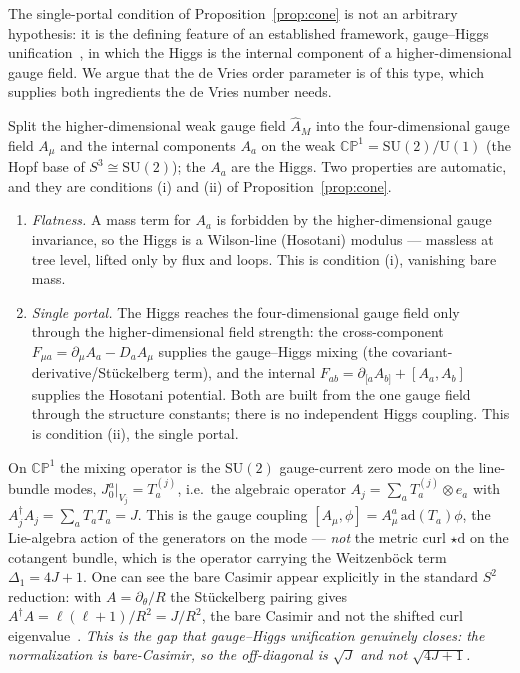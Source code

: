 \documentclass[11pt]{article}
\theoremstyle{plain}
\theoremstyle{definition}
\newcommand{\dd}{\mathrm{d}}
\newcommand{\SU}{\mathrm{SU}}
\newcommand{\U}{\mathrm{U}}
\begin{document}
The single-portal condition of Proposition~\ref{prop:cone} is not an
arbitrary hypothesis: it is the defining feature of an established framework,
gauge--Higgs unification~\cite{Manton1979,Fairlie1979,Hosotani1983}, in which
the Higgs is the internal component of a higher-dimensional gauge field. We
argue that the de Vries order parameter is of this type, which supplies both
ingredients the de Vries number needs.

Split the higher-dimensional weak gauge field $\hat A_M$ into the
four-dimensional gauge field $A_\mu$ and the internal components $A_a$ on the
weak $\mathbb{CP}^1=\SU(2)/\U(1)$ (the Hopf base of $S^3\cong\SU(2)$); the
$A_a$ are the Higgs. Two properties are automatic, and they are conditions
(i) and (ii) of Proposition~\ref{prop:cone}.
\begin{enumerate}
\item \emph{Flatness.} A mass term for $A_a$ is forbidden by the
higher-dimensional gauge invariance, so the Higgs is a Wilson-line (Hosotani)
modulus --- massless at tree level, lifted only by flux and loops. This is
condition (i), vanishing bare mass.
\item \emph{Single portal.} The Higgs reaches the four-dimensional gauge
field only through the higher-dimensional field strength: the cross-component
$F_{\mu a}=\partial_\mu A_a-D_a A_\mu$ supplies the gauge--Higgs mixing (the
covariant-derivative/Stückelberg term), and the internal
$F_{ab}=\partial_{[a}A_{b]}+[A_a,A_b]$ supplies the Hosotani potential. Both
are built from the one gauge field through the structure constants; there is
no independent Higgs coupling. This is condition (ii), the single portal.
\end{enumerate}
On $\mathbb{CP}^1$ the mixing operator is the $\SU(2)$ gauge-current zero mode
on the line-bundle modes, $J_0^a|_{V_j}=T_a^{(j)}$, i.e.\ the algebraic
operator $A_j=\sum_aT_a^{(j)}\otimes e_a$ with $A_j^\dagger A_j=\sum_aT_aT_a=J$.
This is the gauge coupling $[A_\mu,\phi]=A_\mu^a\,\mathrm{ad}(T_a)\phi$, the
Lie-algebra action of the generators on the mode --- \emph{not} the metric
curl $\star\dd$ on the cotangent bundle, which is the operator carrying the
Weitzenb\"ock term $\Delta_1=4J+1$. One can see the bare Casimir appear
explicitly in the standard $S^2$ reduction: with $A=\partial_\theta/R$ the
Stückelberg pairing gives $A^\dagger A=\ell(\ell+1)/R^2=J/R^2$, the bare
Casimir and not the shifted curl eigenvalue~\cite{Manton1979,Hosotani1983}.
\emph{This is the gap that gauge--Higgs unification genuinely closes: the
normalization is bare-Casimir, so the off-diagonal is $\sqrt J$ and not
$\sqrt{4J+1}$.}
\end{document}
